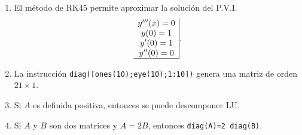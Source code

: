 \documentclass[11pt]{article}
\begin{document}
\begin{enumerate}
\begin{enumerate}
\begin{minipage}{0.4\textwidth}
    \end{minipage}
%
\item
\fbox{ \begin{minipage}{1cm}    \hfill\vspace{1cm}   		
    \end{minipage} } 
    \begin{minipage}{0.4\textwidth}
	El método de RK45 permite aproximar la soluci\'on del P.V.I. 
    $$
    \begin{array}{c|}
    y'''(x)=0\\
    y(0)=1  \\
    y'(0)=1 \\
    y''(0)=0\\ \hline
    \end{array}.
    $$
    \end{minipage} 
    \begin{minipage}{0.4\textwidth}
    \end{minipage}
%
\item
\fbox{ \begin{minipage}{1cm}  \hfill\vspace{1cm}   		
    \end{minipage} } 
    \begin{minipage}{0.4\textwidth}
	La instrucci\'on 
    \texttt{diag([ones(10);eye(10);1:10])}
    genera una matriz de orden $21\times1$.
    \end{minipage} 
    \begin{minipage}{0.4\textwidth}
    \end{minipage}
\item
\fbox{ \begin{minipage}{1cm}  \hfill\vspace{1cm}   		
    \end{minipage} } 
    \begin{minipage}{0.4\textwidth}
	Si $A$ es definida positiva, entonces se puede descomponer LU.
    \end{minipage} 
    \begin{minipage}{0.4\textwidth}
    \end{minipage}
%
\item
\fbox{ \begin{minipage}{1cm}   \hfill\vspace{1cm}   		
    \end{minipage} } 
    \begin{minipage}{0.4\textwidth}
	Si $A$ y $B$ son dos matrices y $A=2B$, entonces \texttt{diag(A)=2\,diag(B)}.
	\end{minipage} 
    \begin{minipage}{0.4\textwidth}
    \end{minipage}
\end{enumerate}


\end{enumerate}
\end{document}
